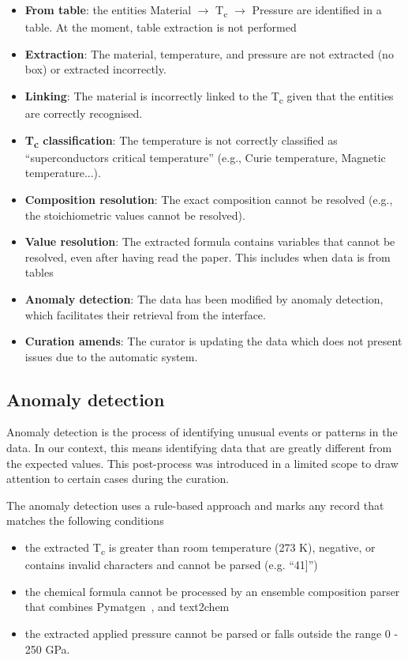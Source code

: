 \begin{itemize}
    \item \textbf{From table}: the entities Material $\rightarrow$ T\textsubscript{c} $\rightarrow$ Pressure are identified in a table. At the moment, table extraction is not performed
    \item \textbf{Extraction}: The material, temperature, and pressure are not extracted (no box) or extracted incorrectly. 
    \item \textbf{Linking}: The material is incorrectly linked to the T\textsubscript{c} given that the entities are correctly recognised.
    \item \textbf{T\textsubscript{c} classification}: The temperature is not correctly classified as ``superconductors critical temperature'' (e.g., Curie temperature, Magnetic temperature...).
    \item \textbf{Composition resolution}: The exact composition cannot be resolved (e.g., the stoichiometric values cannot be resolved).
    \item \textbf{Value resolution}: The extracted formula contains variables that cannot be resolved, even after having read the paper. This includes when data is from tables
    \item \textbf{Anomaly detection}: The data has been modified by anomaly detection, which facilitates their retrieval from the interface.
    \item \textbf{Curation amends}: The curator is updating the data which does not present issues due to the automatic system.
\end{itemize}

\subsection{Anomaly detection}
\label{subsec:anomaly-detection}
Anomaly detection is the process of identifying unusual events or patterns in the data. 
In our context, this means identifying data that are greatly different from the expected values.
This post-process was introduced in a limited scope to draw attention to certain cases during the curation.

The anomaly detection uses a rule-based approach and marks any record that matches the following conditions
\begin{itemize}
    \item the extracted T\textsubscript{c} is greater than room temperature (273 K), negative, or contains invalid characters and cannot be parsed (e.g. ``41]'')
    \item the chemical formula cannot be processed by an ensemble composition parser that combines Pymatgen~\cite{Ong2013}, and text2chem~\cite{kononova2019text} 
    \item the extracted applied pressure cannot be parsed or falls outside the range 0 - 250 GPa.
\end{itemize}

